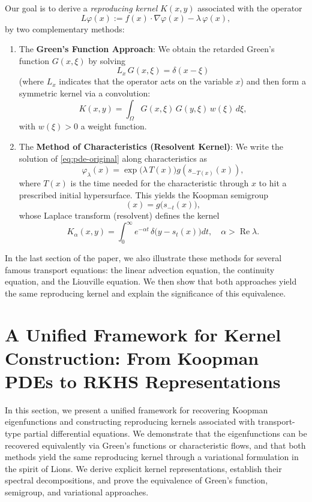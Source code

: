 \documentclass[11pt]{article}
\theoremstyle{plain}
\def\[{\begin{equation}}
\def\]{\end{equation}}
\begin{document}
Our goal is to derive a \emph{reproducing kernel} \(K(x,y)\) associated with the operator
\begin{equation}
\label{eq:operatorL}
L\varphi(x):= f(x)\cdot \nabla \varphi(x)-\lambda\, \varphi(x),
\end{equation}
by two complementary methods:
\begin{enumerate}
  \item The \textbf{Green's Function Approach}: We obtain the retarded Green's function \(G(x,\xi)\) by solving
        \[
        L_x\,G(x,\xi)=\delta(x-\xi)
        \]
        (where \(L_x\) indicates that the operator acts on the variable \(x\)) and then form a symmetric kernel via a convolution:
        \[
        K(x,y)=\int_{\Omega} G(x,\xi)\,G(y,\xi)\,w(\xi)\,d\xi,
        \]
        with \(w(\xi)>0\) a weight function.
  \item The \textbf{Method of Characteristics (Resolvent Kernel)}: We write the solution of \eqref{eq:pde-original} along characteristics as 
        \[
        \varphi_\lambda(x)=\exp\bigl(\lambda\,T(x)\bigr)g(s_{-T(x)}(x)),
        \]
        where \(T(x)\) is the time needed for the characteristic through \(x\) to hit a prescribed initial hypersurface. This yields the Koopman semigroup
        \[
        [T_tg](x)= g\bigl(s_{-t}(x)\bigr),
        \]
        whose Laplace transform (resolvent) defines the kernel
        \[
        K_\alpha(x,y)=\int_{0}^{\infty} e^{-\alpha t}\,\delta\bigl(y-s_t(x)\bigr)dt,\quad \alpha>\operatorname{Re}\lambda.
        \]
\end{enumerate}

In the last section of the paper, we also illustrate these methods for several famous transport equations: the linear advection equation, the continuity equation, and the Liouville equation. We then show that both approaches yield the same reproducing kernel and explain the significance of this equivalence.

 


\section{A Unified Framework for Kernel Construction: From Koopman PDEs to RKHS Representations}
 

 
In this section, we present a unified framework for recovering Koopman eigenfunctions and constructing reproducing kernels associated with transport-type partial differential equations. 
We demonstrate that the eigenfunctions can be recovered equivalently via Green's functions or characteristic flows, and that both methods yield the same reproducing kernel through a variational formulation in the spirit of Lions. 
We derive explicit kernel representations, establish their spectral decompositions, and prove the equivalence of Green’s function, semigroup, and variational approaches. 
 
\end{document}
